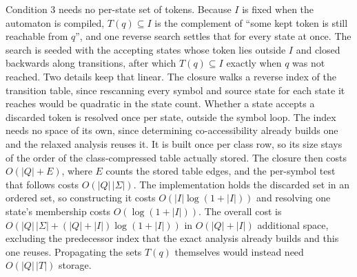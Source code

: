 \documentclass[11pt,a4paper]{article}
\theoremstyle{definition}
\theoremstyle{plain}
\begin{document}
Condition 3 needs no per-state set of tokens. Because $I$ is fixed when the automaton is compiled, $T(q) \subseteq I$ is
the complement of ``some kept token is still reachable from $q$'', and one reverse search settles that for every state
at once. The search is seeded with the accepting states whose token lies outside $I$ and closed backwards along
transitions, after which $T(q) \subseteq I$ exactly when $q$ was not reached. Two details keep that linear. The closure
walks a reverse index of the transition table, since rescanning every symbol and source state for each state it reaches
would be quadratic in the state count. Whether a state accepts a discarded token is resolved once per state, outside the
symbol loop. The index needs no space of its own, since determining co-accessibility already builds one and the relaxed
analysis reuses it. It is built once per class row, so its size stays of the order of the class-compressed table
actually stored. The closure then costs $O(|Q| + E)$, where $E$ counts the stored table edges, and the per-symbol test
that follows costs $O(|Q|\,|\Sigma|)$. The implementation holds the discarded set in an ordered set, so constructing it
costs $O(|I| \log(1 + |I|))$ and resolving one state's membership costs $O(\log(1 + |I|))$. The overall cost is
$O(|Q|\,|\Sigma| + (|Q| + |I|) \log(1 + |I|))$ in $O(|Q| + |I|)$ additional space, excluding the predecessor index that
the exact analysis already builds and this one reuses. Propagating the sets $T(q)$ themselves would instead need
$O(|Q|\,|T|)$ storage.
\end{document}
